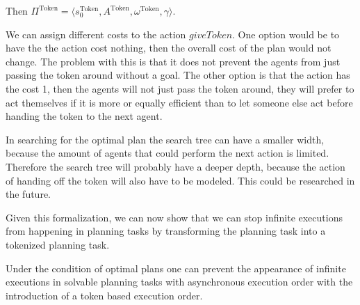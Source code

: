 Then $ \Pi^{\text{Token}} = \langle s_0^{\text{Token}}, A ^{\text{Token}}, \omega ^{\text{Token}}, \gamma \rangle $.

We can assign different costs to the action $giveToken$. One option would be to have the the action cost nothing, then the overall cost of the plan would not change. The problem with this is that it does not prevent the agents from just passing the token around without a goal. The other option is that the action has the cost 1, then the agents will not just pass the token around, they will prefer to act themselves if it is more or equally efficient than to let someone else act before handing the token to the next agent.

In searching for the optimal plan the search tree can have a smaller width, because the amount of agents that could perform the next action is limited. Therefore the search tree will probably have a deeper depth, because the action of handing off the token will also have to be modeled. This could be researched in the future.


Given this formalization, we can now show that we can stop infinite executions from happening in planning tasks by transforming the planning task into a tokenized planning task.

\begin{theorem}
Under the condition of optimal plans one can prevent the appearance of infinite executions in solvable planning tasks with asynchronous execution order with the introduction of a token based execution order.
\end{theorem}


